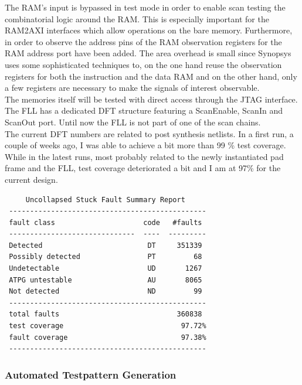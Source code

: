 The RAM's input is bypassed in test mode in order to enable scan testing the combinatorial logic around the RAM. This is especially important for the RAM2AXI interfaces which allow operations on the bare memory. Furthermore, in order to observe the address pins of the RAM observation registers for the RAM address port have been added. The area overhead is small since Synopsys uses some sophisticated techniques to, on the one hand reuse the observation registers for both the instruction and the data RAM and on the other hand, only a few registers are necessary to make the signals of interest observable. \\
The memories itself will be tested with direct access through the JTAG interface. \\
The FLL has a dedicated DFT structure featuring a ScanEnable, ScanIn and ScanOut port. Until now the FLL is not part of one of the scan chains. \\
The current DFT numbers are related to post synthesis netlists. In a first run, a couple of weeks ago, I was able to achieve a bit more than 99 \% test coverage. While in the latest runs, most probably related to the newly instantiated pad frame and the FLL, test coverage deteriorated a bit and I am at 97\% for the current design. \\


\begin{lstlisting}
     Uncollapsed Stuck Fault Summary Report
 -----------------------------------------------
 fault class                     code   #faults
 ------------------------------  ----  ---------
 Detected                         DT     351339
 Possibly detected                PT         68
 Undetectable                     UD       1267
 ATPG untestable                  AU       8065
 Not detected                     ND         99
 -----------------------------------------------
 total faults                            360838
 test coverage                            97.72%
 fault coverage                           97.38%
 -----------------------------------------------
\end{lstlisting}

\subsubsection{Automated Testpattern Generation}


